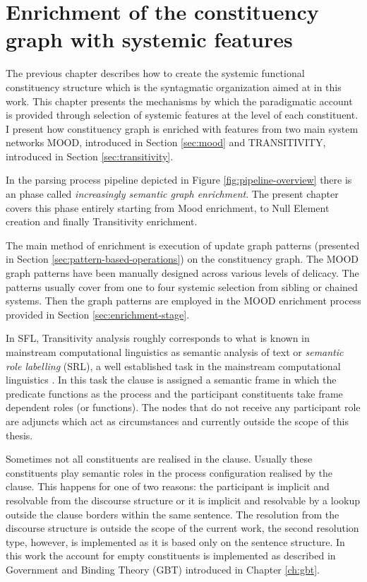 \chapter{Enrichment of the constituency graph with systemic features}
\label{ch:enrichment-stage}

The previous chapter describes how to create the systemic functional constituency structure which is the syntagmatic organization aimed at in this work. This chapter presents the mechanisms by which the paradigmatic account is provided through selection of systemic features at the level of each constituent. I present how constituency graph is enriched with features from two main system networks MOOD, introduced in Section \ref{sec:mood} and TRANSITIVITY, introduced in Section \ref{sec:transitivity}.

In the parsing process pipeline depicted in Figure \ref{fig:pipeline-overview} there is an phase called \textit{increasingly semantic graph enrichment}. The present chapter covers this phase entirely starting from Mood enrichment, to Null Element creation and finally Transitivity enrichment.

The main method of enrichment is execution of update graph patterns (presented in Section \ref{sec:pattern-based-operations}) on the constituency graph. The MOOD graph patterns have been manually designed across various levels of delicacy. The patterns usually cover from one to four systemic selection from sibling or chained systems. Then the graph patterns are employed in the MOOD enrichment process provided  in Section \ref{sec:enrichment-stage}. 

In SFL, Transitivity analysis roughly corresponds to what is known in mainstream computational linguistics as semantic analysis of text or \textit{semantic role labelling} (SRL), a well established task in the mainstream computational linguistics \citep{Carreras2005, Pradhan2007}. In this task the clause is assigned a semantic frame in which the predicate functions as the process and the participant constituents take frame dependent roles (or functions). The nodes that do not receive any participant role are adjuncts which act as circumstances and currently outside the scope of this thesis.

Sometimes not all constituents are realised in the clause. Usually these constituents play semantic roles in the process configuration realised by the clause. This happens for one of two reasons: the participant is implicit and resolvable from the discourse structure or it is implicit and resolvable by a lookup outside the clause borders within the same sentence. The resolution from the discourse structure is outside the scope of the current work, the second resolution type, however, is implemented as it is based only on the sentence structure. In this work the account for empty constituents is implemented as described in Government and Binding Theory (GBT) \citep{Haegeman1991} introduced in Chapter \ref{ch:gbt}.


